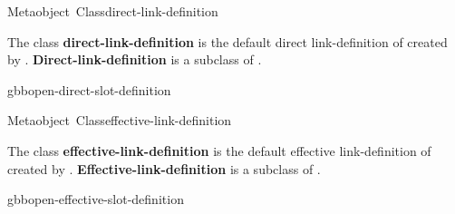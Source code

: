 \documentclass[10pt,twoside,english,pdftex]{article}
\begin{document}

\begin{functiondoc}{Metaobject~Class}{direct-link-definition}{}
%

\fnsyntax

\fnpackage {}

\fnmodule {}

\fndescription The class \textbf{direct-link-definition} is the default
direct link-definition  of 
created by \textbf{}.
\textbf{Direct-link-definition} is a subclass of
\textbf{}.

\begin{alsos}{gbbopen-direct-slot-definition}
\end{alsos}

\end{functiondoc}


\begin{functiondoc}{Metaobject~Class}{effective-link-definition}{}
%

\fnsyntax

\fnpackage {}

\fnmodule {}

\fndescription The class \textbf{effective-link-definition} is the default
effective link-definition  of 
created by \textbf{}.
\textbf{Effective-link-definition} is a subclass of
\textbf{}.

\begin{alsos}{gbbopen-effective-slot-definition}
\end{alsos}

\end{functiondoc}

\end{document}
